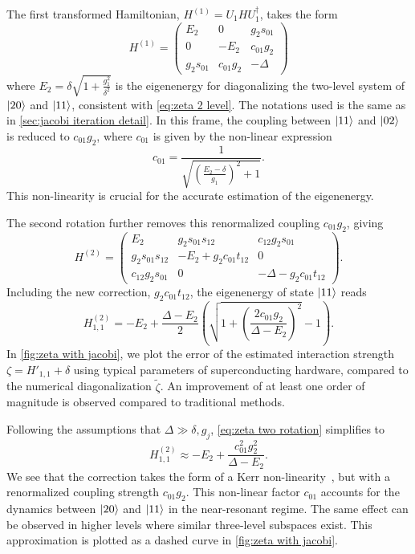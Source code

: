 \documentclass[%
 reprint,
 amsmath,amssymb,
 aps,
pra,
noeprint,
superscriptaddress,
]{revtex4-2}
\begin{document}
The first transformed Hamiltonian, $H^{(1)} = U_1 H U_1^{\dagger} $, takes the form
\begin{equation}
H^{(1)} = 
\begin{pmatrix}
    E_2& 0& g_2s_{01} \\
    0& -E_2& c_{01}g_2 \\
    g_2s_{01}& c_{01}g_2& -\Delta
\end{pmatrix}
\end{equation}
where $E_2 = \delta\sqrt{1 + \frac{g_1^2}{\delta^2}}$ is the eigenenergy for diagonalizing the two-level system of $\ket{20}$ and $\ket{11}$, consistent with \cref{eq:zeta 2 level}.
The notations used is the same as in \cref{sec:jacobi iteration detail}.
In this frame, the coupling between $\ket{11}$ and $\ket{02}$ is reduced to $c_{01}g_2$, where $c_{01}$ is given by the non-linear expression
\begin{equation}
    c_{01} = 
    \frac{1} {
        \sqrt{
        \left(
        \frac{E_2-\delta}{g_1}
        \right)
        ^2 + 1
        }
    }
    .
\end{equation}
This non-linearity is crucial for the accurate estimation of the eigenenergy.

The second rotation further removes this renormalized coupling $c_{01}g_2$, giving
\begin{equation}
H^{(2)} = 
\begin{pmatrix}
    E_2 & g_2 s_{01} s_{12}& c_{12} g_2 s_{01}\\
    g_2 s_{01} s_{12}& - E_2 + g_2c_{01} t_{12} & 0\\
    c_{12} g_2 s_{01}& 0& -\Delta - g_2c_{01} t_{12} 
\end{pmatrix}
.
\end{equation}
Including the new correction, $g_2c_{01} t_{12}$, the eigenenergy of state $\ket{11}$ reads
\begin{equation}
    \label{eq:zeta two rotation}
    H^{(2)}_{1,1} =
    -E_2 + \frac{\Delta - E_2}{2} \left(\sqrt{1 + \left(\frac{2 c_{01} g_2}{\Delta - E_2} \right)^2}-1 \right)
    .
\end{equation}
In \cref{fig:zeta with jacobi}, we plot the error of the estimated interaction strength $\zeta = H'_{1,1}+\delta$ using typical parameters of superconducting hardware, compared to the numerical diagonalization $\tilde{\zeta}$.
An improvement of at least one order of magnitude is observed compared to traditional methods.

Following the assumptions that $\Delta \gg \delta, g_j$, \cref{eq:zeta two rotation} simplifies to 
\begin{equation}
    \label{eq:zeta two rotation + approximation}
    \boxed{
    H^{(2)}_{1,1} \approx
    - E_2 + \frac{c_{01}^2 g_2^2}{\Delta - E_2}
    }
    .
\end{equation}
We see that the correction takes the form of a Kerr non-linearity~\cite{Holland2015}, but with a renormalized coupling strength $c_{01} g_2$.
This non-linear factor $c_{01}$ accounts for the dynamics between $\ket{20}$ and $\ket{11}$ in the near-resonant regime.
The same effect can be observed in higher levels where similar three-level subspaces exist.
This approximation is plotted as a dashed curve in \cref{fig:zeta with jacobi}.
\end{document}
